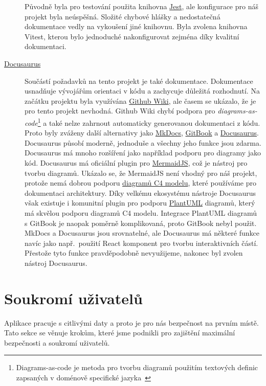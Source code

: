 \begin{description}
    Původně byla pro testování použita knihovna \href{https://jestjs.io/}{Jest}, ale konfigurace pro náš projekt byla neúspěšná.
    Složité chybové hlášky a nedostatečná dokumentace vedly na vykoušení jiné knihovnu.
    Byla zvolena knihovna Vitest, kterou bylo jednoduché nakonfigurovat zejména díky kvalitní dokumentaci.
    \item[\href{https://docusaurus.io/}{Docusaurus}]
    Součástí požadavků na tento projekt je také dokumentace.
    Dokumentace usnadňuje vývojářům orientaci v kódu a zachycuje důležitá rozhodnutí.
    Na začátku projektu byla využívána \href{https://docs.github.com/en/communities/documenting-your-project-with-wikis/about-wikis}{Github Wiki}, ale časem se ukázalo, že je pro tento projekt nevhodná.
    Github Wiki chybí podpora pro \textit{diagrams-as-code}\footnote{Diagrams-as-code je metoda pro tvorbu diagramů použitím textových definic zapsaných v doménově specifické jazyka~\cite{what-is-diagrams-as-code}} a také nelze zahrnout automaticky generovanou dokumentaci z kódu.
    Proto byly zváženy další alternativy jako \href{https://www.mkdocs.org/}{MkDocs}, \href{https://www.gitbook.com/}{GitBook} a \href{https://docusaurus.io/}{Docusaurus}.
    Docusaurus působí moderně, jednoduše a všechny jeho funkce jsou zdarma.
    Docusaurus má mnoho rozšíření jako například podporu pro diagramy jako kód.
    Docusaurus má oficiální plugin pro \href{https://mermaid.js.org/}{MermaidJS}, což je nástroj pro tvorbu diagramů.
    Ukázalo se, že MermaidJS není vhodný pro náš projekt, protože nemá dobrou podporu \href{https://c4model.com/}{diagramů C4 modelu}, které používáme pro dokumentaci architektury.
    Díky velkému ekosystému nástroje Docusaurus však existuje i komunitní plugin pro podporu \href{https://plantuml.com/}{PlantUML} diagramů, který má skvělou podporu diagramů C4 modelu.
    Integrace PlantUML diagramů s GitBook je naopak poměrně komplikovaná, proto GitBook nebyl použit.
    MkDocs a Docusaurus jsou srovnatelné, ale Docusaurus má některé funkce navíc jako např.\ použití React komponent pro tvorbu interaktivních částí.
    Přestože tyto funkce pravděpodobně nevyužijeme, nakonec byl zvolen nástroj Docusaurus.
\end{description}


\section{Soukromí uživatelů}\label{sec:soukromi-uzivatelu}

Aplikace pracuje s citlivými daty a proto je pro nás bezpečnost na prvním místě.
Tato sekce se věnuje krokům, které jsme podnikli pro zajištění maximální bezpečnosti a soukromí uživatelů.

